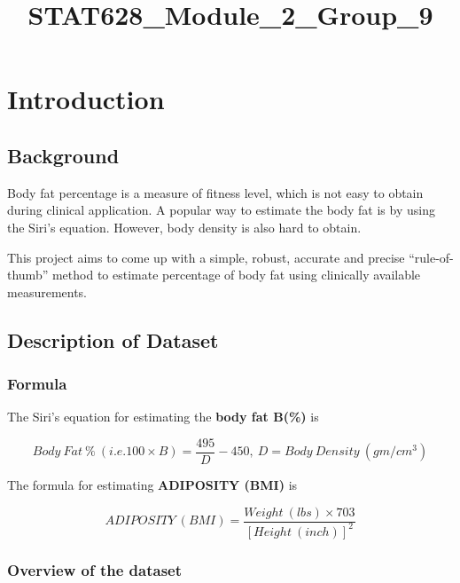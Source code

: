 \documentclass[11pt]{article}
\title{STAT628\_Module\_2\_Group\_9}
\begin{document}
    
    
    \maketitle
    
    

    
    \hypertarget{introduction}{%
\section{Introduction}\label{introduction}}

\hypertarget{background}{%
\subsection{Background}\label{background}}

Body fat percentage is a measure of fitness level, which is not easy to
obtain during clinical application. A popular way to estimate the body
fat is by using the Siri's equation. However, body density is also hard
to obtain.

This project aims to come up with a simple, robust, accurate and precise
``rule-of-thumb'' method to estimate percentage of body fat using
clinically available measurements.

\hypertarget{description-of-dataset}{%
\subsection{Description of Dataset}\label{description-of-dataset}}

\hypertarget{formula}{%
\subsubsection{Formula}\label{formula}}

The Siri's equation for estimating the \textbf{body fat B(\%)} is

\[ Body\ Fat\ \%\ (i.e. 100 \times B) = \frac{495}{D} - 450,\ D = Body\ Density\ (gm/cm^{3})\]

The formula for estimating \textbf{ADIPOSITY (BMI)} is

\[ADIPOSITY\ (BMI)= \frac{Weight\ (lbs) \times 703}{[Height\ (inch)]^2}\]

    \hypertarget{overview-of-the-dataset}{%
\subsubsection{Overview of the dataset}\label{overview-of-the-dataset}}
\end{document}
